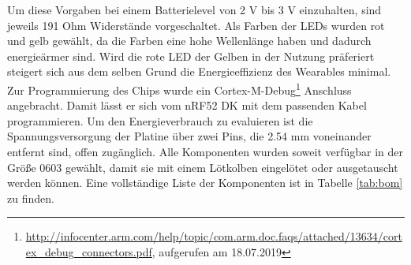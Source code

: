 Um diese Vorgaben bei einem Batterielevel von 2 V bis 3 V einzuhalten, sind jeweils 191 Ohm Widerstände vorgeschaltet.
Als Farben der LEDs wurden rot und gelb gewählt, da die Farben eine hohe Wellenlänge haben und dadurch energieärmer sind.
Wird die rote LED der Gelben in der Nutzung präferiert steigert sich aus dem selben Grund die Energieeffizienz des Wearables minimal.
Zur Programmierung des Chips wurde ein Cortex-M-Debug\footnote{\url{http://infocenter.arm.com/help/topic/com.arm.doc.faqs/attached/13634/cortex_debug_connectors.pdf}, aufgerufen am 18.07.2019} Anschluss angebracht.
Damit lässt er sich vom nRF52 DK mit dem passenden Kabel programmieren.
Um den Energieverbrauch zu evaluieren ist die Spannungsversorgung der Platine über zwei Pins, die 2.54 mm voneinander entfernt sind, offen zugänglich.
Alle Komponenten wurden soweit verfügbar in der Größe 0603 gewählt, damit sie mit einem Lötkolben eingelötet oder ausgetauscht werden können.
Eine vollständige Liste der Komponenten ist in Tabelle \ref{tab:bom} zu finden.\\

